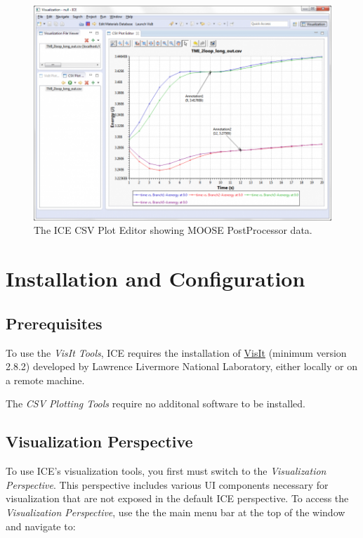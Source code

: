 \begin{figure}[htbp]
\centering
\includegraphics[width=\textwidth]{figures/ICE_CSVPlotter.png}
\caption{The ICE CSV Plot Editor showing MOOSE PostProcessor data.}
\end{figure}
\newpage

\section{Installation and
Configuration}\label{installation-and-configuration}

\subsection{Prerequisites}\label{prerequisites}

To use the \emph{VisIt Tools}, ICE requires the installation of
\href{https://wci.llnl.gov/simulation/computer-codes/visit/}{VisIt}
(minimum version 2.8.2) developed by Lawrence Livermore National
Laboratory, either locally or on a remote machine.

The \emph{CSV Plotting Tools} require no additonal software to be
installed.

\subsection{Visualization
Perspective}\label{visualization-perspective}

To use ICE's visualization tools, you first must switch to the
\emph{Visualization Perspective}. This perspective includes various UI
components necessary for visualization that are not exposed in the
default ICE perspective. To access the \emph{Visualization Perspective},
use the the main menu bar at the top of the window and navigate to:

